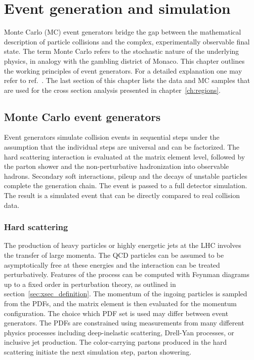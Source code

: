\chapter{Event generation and simulation}
\label{sec:MC}

Monte Carlo (MC) event generators bridge the gap between the mathematical description of particle collisions and the complex, experimentally observable final state. 
The term Monte Carlo refers to the stochastic nature of the underlying physics,
in analogy with the gambling district of Monaco.
This chapter outlines the working principles of event generators.
For a detailed explanation one may refer to ref.~\cite{Buckley_2011}.
The last section of this chapter lists the data and MC samples 
that are used for the cross section analysis presented in chapter~\ref{ch:regions}.

\section{Monte Carlo event generators}

Event generators simulate collision events in sequential steps under
the assumption that the individual steps are universal and can be factorized.
The hard scattering interaction is evaluated at the matrix element level, followed by the parton shower and the non-perturbative hadronization into observable hadrons. 
Secondary soft interactions, pileup and the decays of unstable particles complete the generation chain. The event is passed to a full detector simulation. The result is a simulated event that can be directly compared to real collision data.


\subsection{Hard scattering}

The production of heavy particles or highly energetic jets at the LHC
involves the transfer of large momenta. The QCD particles can be 
assumed to be asymptotically free at these energies and the interaction
can be treated perturbatively. 
Features of the process can be computed with Feynman diagrams up
to a fixed order in perturbation theory, as outlined in section~\ref{sec:xsec_definition}.
The momentum of the ingoing particles is sampled from the PDFs,
and the matrix element is then evaluated for the momentum configuration.
The choice which PDF set is used may differ between event generators.
The PDFs are constrained using measurements from many different
physics processes including deep-inelastic scattering, Drell-Yan processes, or
inclusive jet production.
The color-carrying partons produced in the hard scattering
initiate the next simulation step, parton showering.

